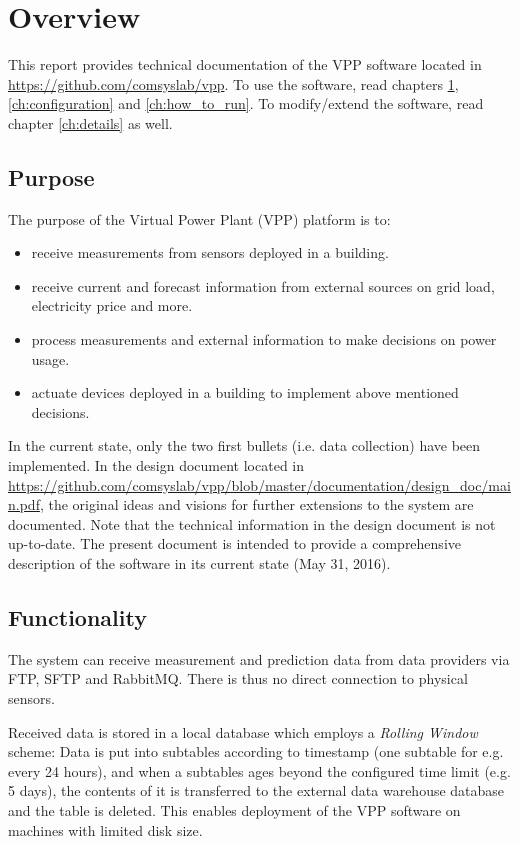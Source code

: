 \chapter{Overview} \label{ch:overview}

This report provides technical documentation of the VPP software located in \url{https://github.com/comsyslab/vpp}. To use the software, read chapters \ref{ch:overview}, \ref{ch:configuration} and \ref{ch:how_to_run}. To modify/extend the software, read chapter \ref{ch:details} as well.

\section{Purpose}

The purpose of the Virtual Power Plant (VPP) platform is to:
\begin{itemize}

	\item receive measurements from sensors deployed in a building.
	\item receive current and forecast information from external sources on grid load, electricity price and more.
	\item process measurements and external information to make decisions on power usage.
	\item actuate devices deployed in a building to implement above mentioned decisions.
\end{itemize} 

In the current state, only the two first bullets (i.e. data collection) have been implemented. In the design document located in \url{https://github.com/comsyslab/vpp/blob/master/documentation/design_doc/main.pdf}, the original ideas and visions for further extensions to the system are documented. Note that the technical information in the design document is not up-to-date. The present document is intended to provide a comprehensive description of the software in its current state (May 31, 2016).

\section{Functionality}
The system can receive measurement and prediction data from data providers via FTP, SFTP and RabbitMQ. There is thus no direct connection to physical sensors. 

Received data is stored in a local database which employs a \emph{Rolling Window} scheme: Data is put into subtables according to timestamp (one subtable for e.g. every 24 hours), and when a subtables ages beyond the configured time limit (e.g. 5 days), the contents of it is transferred to the external data warehouse database and the table is deleted. This enables deployment of the VPP software on machines with limited disk size.

